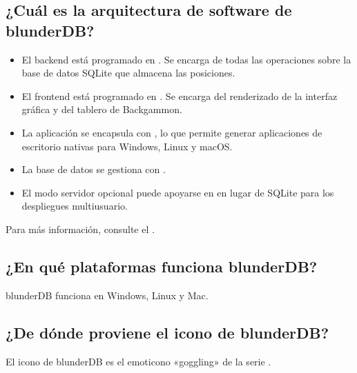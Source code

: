 \documentclass[letterpaper,10pt,spanish]{sphinxmanual}
\begin{document}
\subsection{¿Cuál es la arquitectura de software de blunderDB?}
\label{\detokenize{faq:quel-est-l-architecture-logicielle-de-blunderdb}}\begin{itemize}
\item {} 
\sphinxAtStartPar
El backend está programado en . Se encarga de todas las operaciones sobre la base de datos SQLite que almacena las posiciones.

\item {} 
\sphinxAtStartPar
El frontend está programado en . Se encarga del renderizado de la interfaz gráfica y del tablero de Backgammon.

\item {} 
\sphinxAtStartPar
La aplicación se encapsula con , lo que permite generar aplicaciones de escritorio nativas para Windows, Linux y macOS.

\item {} 
\sphinxAtStartPar
La base de datos se gestiona con .

\item {} 
\sphinxAtStartPar
El modo servidor opcional puede apoyarse en  en lugar de SQLite para los despliegues multiusuario.

\end{itemize}

\sphinxAtStartPar
Para más información, consulte el .


\subsection{¿En qué plataformas funciona blunderDB?}
\label{\detokenize{faq:sur-quelles-plateformes-blunderdb-fonctionne-t-il}}
\sphinxAtStartPar
blunderDB funciona en Windows, Linux y Mac.


\subsection{¿De dónde proviene el icono de blunderDB?}
\label{\detokenize{faq:d-ou-vient-l-icone-de-blunderdb}}
\sphinxAtStartPar
El icono de blunderDB es el emoticono «goggling» de la serie .
\end{document}
